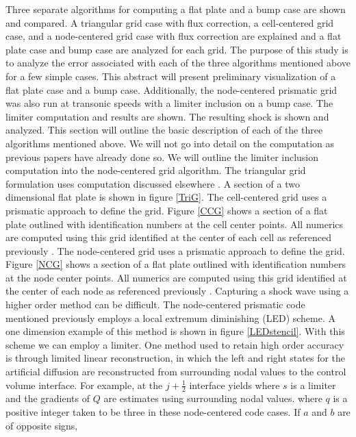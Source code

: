 
Three separate algorithms for computing a flat plate and a bump case are shown and compared.  A triangular grid case with flux correction, a cell-centered grid case, and a node-centered grid case with flux correction are explained and a flat plate case and bump case are analyzed for each grid. The purpose of this study is to analyze the error associated with each of the three algorithms mentioned above for a few simple cases.  This abstract will present preliminary visualization of a flat plate case and a bump case.  Additionally, the node-centered prismatic grid was also run at transonic speeds with a limiter inclusion on a bump case.  The limiter computation and results are shown.  The resulting shock is shown and analyzed. 
This section will outline the basic description of each of the three algorithms mentioned above.  We will not go into detail on the computation as previous papers have already done so.  We will outline the limiter inclusion computation into the node-centered grid algorithm.
The triangular grid formulation uses computation discussed elsewhere \cite{Work2014}.  A section of a two dimensional flat plate is shown in figure \ref{TriG}.  
The cell-centered grid uses a prismatic approach to define the grid.  Figure \ref{CCG} shows a section of a flat plate outlined with identification numbers at the cell center points.  All numerics are computed using this grid identified at the center of each cell as referenced previously \cite{Katz2015}.  
The node-centered grid uses a prismatic approach to define the grid.  Figure \ref{NCG} shows a section of a flat plate outlined with identification numbers at the node center points.  All numerics are computed using this grid identified at the center of each node as referenced previously \cite{Katz2015}.
Capturing a shock wave using a higher order method can be difficult.  The node-centered prismatic code mentioned previously \cite{Katz2015} employs a local extremum diminishing (LED) scheme.  A one dimension example of this method is shown in figure \ref{LEDstencil}.  With this scheme we can employ a limiter.  One method used to retain high order accuracy is through limited linear reconstruction, in which the left and right states for the artificial diffusion are reconstructed from surrounding nodal values to the control volume interface.  For example, at the $j + \frac{1}{2}$ interface yields  
where $s$ is a limiter and the gradients of $Q$ are estimates using surrounding nodal values.
where $q$ is a positive integer taken to be three in these node-centered code cases.
If $a$ and $b$ are of opposite signs,
